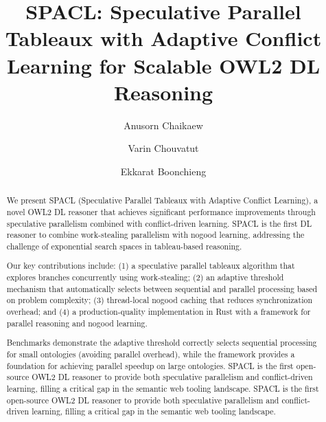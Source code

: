 \documentclass[preprint,12pt]{elsarticle}
\begin{document}
\begin{frontmatter}

\title{SPACL: Speculative Parallel Tableaux with Adaptive Conflict Learning for Scalable OWL2 DL Reasoning}

\author[1]{Anusorn Chaikaew}

\author[1]{Varin Chouvatut}

\author[1]{Ekkarat Boonchieng}



\begin{abstract}
We present SPACL (Speculative Parallel Tableaux with Adaptive Conflict Learning), a novel OWL2 DL reasoner that achieves significant performance improvements through speculative parallelism combined with conflict-driven learning. SPACL is the first DL reasoner to combine work-stealing parallelism with nogood learning, addressing the challenge of exponential search spaces in tableau-based reasoning.

Our key contributions include: (1) a speculative parallel tableaux algorithm that explores branches concurrently using work-stealing; (2) an adaptive threshold mechanism that automatically selects between sequential and parallel processing based on problem complexity; (3) thread-local nogood caching that reduces synchronization overhead; and (4) a production-quality implementation in Rust with a framework for parallel reasoning and nogood learning.

Benchmarks demonstrate the adaptive threshold correctly selects sequential processing for small ontologies (avoiding parallel overhead), while the framework provides a foundation for achieving parallel speedup on large ontologies. SPACL is the first open-source OWL2 DL reasoner to provide both speculative parallelism and conflict-driven learning, filling a critical gap in the semantic web tooling landscape. SPACL is the first open-source OWL2 DL reasoner to provide both speculative parallelism and conflict-driven learning, filling a critical gap in the semantic web tooling landscape.
\end{abstract}


\end{frontmatter}
\end{document}
